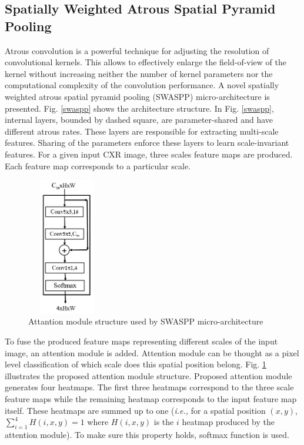 \subsection{Spatially Weighted Atrous Spatial Pyramid Pooling}

Atrous convolution is a powerful technique for adjusting the resolution of  convolutional kernels. This allows to effectively enlarge the field-of-view of the kernel without increasing neither the number of kernel parameters  nor the computational complexity of  the convolution performance. A novel spatially weighted atrous spatial pyramid pooling (SWASPP) micro-architecture is presented. Fig. \ref{swaspp} shows the architecture structure. In Fig. \ref{swaspp}, internal layers, bounded by dashed square, are parameter-shared and have different atrous rates. These layers are responsible for extracting multi-scale features. Sharing of the parameters enforce these layers to learn scale-invariant features. For a given input CXR image,  three scales feature maps are produced. Each feature map  corresponds to a particular scale. 

\begin{center}
    \begin{figure}[htbp]
    \centerline{\includegraphics[height=60mm,width=3.5cm]{Figures/AttentionModUl.PNG}}
    \caption{Attantion module structure used by SWASPP micro-architecture}
    \label{attain}
    \end{figure}
    \end{center}
    
To fuse the produced feature maps representing different scales of the input image, an attention module is added. Attention module can be thought as a pixel level classification of which scale does this spatial position belong. Fig. \ref{attain} illustrates the proposed attention module structure. Proposed attention module generates four heatmaps. The first three heatmaps correspond to the three scale feature maps while the remaining heatmap corresponds to the input feature map itself. These heatmaps are summed  up to one (\textit{i.e.,} for a  spatial position 
$(x, y)$, $\sum_{i =1}^{4} H(i,x,y) = 1$ where $H(i,x,y)$ is the $i$ heatmap produced by the attention module). To make sure this property holds, softmax function is used. 

